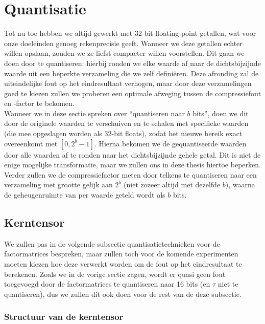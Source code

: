 \section{Quantisatie}
\label{sec:quantisatie}

Tot nu toe hebben we altijd gewerkt met 32-bit floating-point getallen, wat voor onze doeleinden genoeg rekenprecisie geeft. Wanneer we deze getallen echter willen opslaan, zouden we ze liefst compacter willen voorstellen. Dit gaan we doen door te quantiseren: hierbij ronden we elke waarde af naar de dichtsbijzijnde waarde uit een beperkte verzameling die we zelf defini\"eren. Deze afronding zal de uiteindelijke fout op het eindresultaat verhogen, maar door deze verzamelingen goed te kiezen zullen we proberen een optimale afweging tussen de compressiefout en -factor te bekomen.\\

Wanneer we in deze sectie spreken over ``quantiseren naar $b$ bits'', doen we dit door de originele waarden te verschuiven en te schalen met specifieke waarden (die mee opgeslagen worden als 32-bit floats), zodat het nieuwe bereik exact overeenkomt met $[0, 2^b - 1]$. Hierna bekomen we de gequantiseerde waarden door alle waarden af te ronden naar het dichtsbijzijnde gehele getal. Dit is niet de enige mogelijke transformatie, maar we zullen ons in deze thesis hiertoe beperken. Verder zullen we de compressiefactor meten door telkens te quantiseren naar een verzameling met grootte gelijk aan $2^b$ (niet zozeer altijd met dezelfde $b$), waarna de geheugenruimte van per waarde geteld wordt als $b$ bits. 

\subsection{Kerntensor}

We zullen pas in de volgende subsectie quantisatietechnieken voor de factormatrices bespreken, maar zullen toch voor de komende experimenten moeten kiezen hoe deze verwerkt worden om de fout op het eindresultaat te berekenen. Zoals we in de vorige sectie zagen, wordt er quasi geen fout toegevoegd door de factormatrices te quantiseren naar 16 bits (en $\tau$ niet te quantiseren), dus we zullen dit ook doen voor de rest van de deze subsectie.

\subsubsection{Structuur van de kerntensor}


